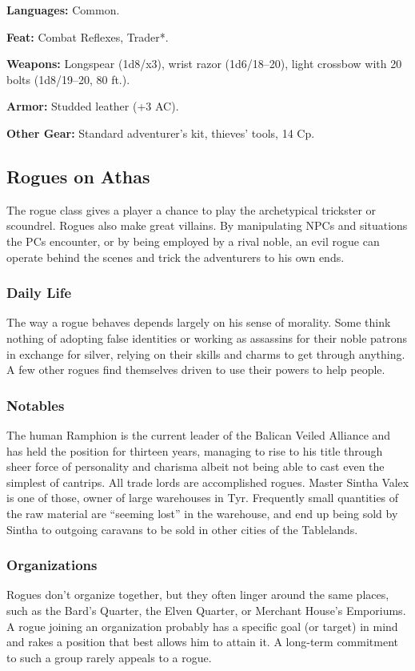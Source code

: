 \textbf{Languages:} Common.

\textbf{Feat:} Combat Reflexes, Trader*.

\textbf{Weapons:} Longspear (1d8/x3), wrist razor (1d6/18–20), light crossbow with 20 bolts (1d8/19–20, 80 ft.).

\textbf{Armor:} Studded leather (+3 AC).

\textbf{Other Gear:} Standard adventurer's kit, thieves' tools, 14 Cp.

\subsection{Rogues on Athas}

The rogue class gives a player a chance to play the archetypical trickster or scoundrel. Rogues also make great villains. By manipulating NPCs and situations the PCs encounter, or by being employed by a rival noble, an evil rogue can operate behind the scenes and trick the adventurers to his own ends.

\subsubsection{Daily Life}
The way a rogue behaves depends largely on his sense of morality. Some think nothing of adopting false identities or working as assassins for their noble patrons in exchange for silver, relying on their skills and charms to get through anything. A few other rogues find themselves driven to use their powers to help people.

\subsubsection{Notables}
The human Ramphion is the current leader of the Balican Veiled Alliance and has held the position for thirteen years, managing to rise to his title through sheer force of personality and charisma albeit not being able to cast even the simplest of cantrips. All trade lords are accomplished rogues. Master Sintha Valex is one of those, owner of large warehouses in Tyr. Frequently small quantities of the raw material are ``seeming lost'' in the warehouse, and end up being sold by Sintha to outgoing caravans to be sold in other cities of the Tablelands.

\subsubsection{Organizations}
Rogues don't organize together, but they often linger around the same places, such as the Bard's Quarter, the Elven Quarter, or Merchant House's Emporiums. A rogue joining an organization probably has a specific goal (or target) in mind and rakes a position that best allows him to attain it. A long-term commitment to such a group rarely appeals to a rogue.

